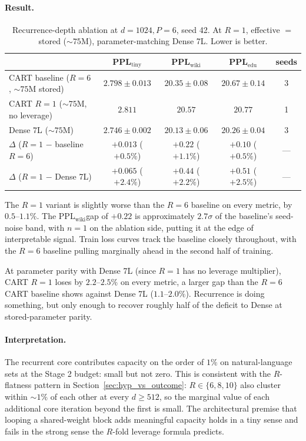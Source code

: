 \documentclass{article}
\newcommand{\cart}{\textsc{CART}}
\newcommand{\pplwiki}{PPL$_\text{wiki}$}
\newcommand{\ppltiny}{PPL$_\text{tiny}$}
\newcommand{\ppledu}{PPL$_\text{edu}$}
\begin{document}
\paragraph{Result.}

\begin{table}[htbp]
\centering
\caption{Recurrence-depth ablation at $d{=}1024, P{=}6$, seed 42. At $R{=}1$, effective $=$ stored ($\sim 75$M), parameter-matching Dense 7L. Lower is better.}
\label{tab:abl_r1}
\footnotesize
\begin{tabular}{lcccc}
\toprule
 & \ppltiny & \pplwiki & \ppledu & seeds \\
\midrule
\cart{} baseline ($R{=}6$, $\sim 75$M stored)  & $2.798 \pm 0.013$ & $20.35 \pm 0.08$ & $20.67 \pm 0.14$ & 3 \\
\cart{} $R{=}1$ ($\sim 75$M, no leverage)      & $2.811$           & $20.57$          & $20.77$          & 1 \\
Dense 7L ($\sim 75$M)                          & $2.746 \pm 0.002$ & $20.13 \pm 0.06$ & $20.26 \pm 0.04$ & 3 \\
\midrule
$\Delta$ ($R{=}1$ $-$ baseline $R{=}6$)        & $+0.013$ ($+0.5\%$) & $+0.22$ ($+1.1\%$) & $+0.10$ ($+0.5\%$) & --- \\
$\Delta$ ($R{=}1$ $-$ Dense 7L)                & $+0.065$ ($+2.4\%$) & $+0.44$ ($+2.2\%$) & $+0.51$ ($+2.5\%$) & --- \\
\bottomrule
\end{tabular}
\end{table}

The $R{=}1$ variant is slightly worse than the $R{=}6$ baseline on every metric, by $0.5$--$1.1\%$. The \pplwiki gap of $+0.22$ is approximately $2.7\sigma$ of the baseline's seed-noise band, with $n{=}1$ on the ablation side, putting it at the edge of interpretable signal. Train loss curves track the baseline closely throughout, with the $R{=}6$ baseline pulling marginally ahead in the second half of training.

At parameter parity with Dense 7L (since $R{=}1$ has no leverage multiplier), \cart{} $R{=}1$ loses by $2.2$--$2.5\%$ on every metric, a larger gap than the $R{=}6$ \cart{} baseline shows against Dense 7L ($1.1$--$2.0\%$). Recurrence is doing something, but only enough to recover roughly half of the deficit to Dense at stored-parameter parity.

\paragraph{Interpretation.}
The recurrent core contributes capacity on the order of $1\%$ on natural-language sets at the Stage 2 budget: small but not zero. This is consistent with the $R$-flatness pattern in Section~\ref{sec:hyp_vs_outcome}: $R \in \{6, 8, 10\}$ also cluster within $\sim 1\%$ of each other at every $d \geq 512$, so the marginal value of each additional core iteration beyond the first is small. The architectural premise that looping a shared-weight block adds meaningful capacity holds in a tiny sense and fails in the strong sense the $R$-fold leverage formula predicts.
\end{document}
